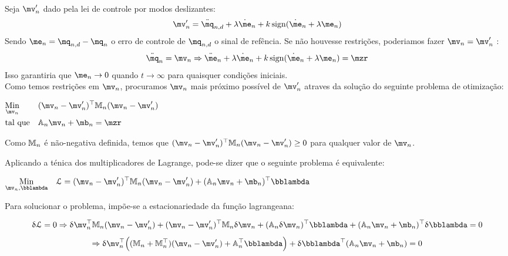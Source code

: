 Seja $\mv'_n$ dado pela lei de controle por modos deslizantes:
\begin{equation} \label{eq:SMControlowLasV1'}
\mv'_n = \ddot{\mq}_{n, d} + \lambda \dot{\me}_n + k \sign (\dot{\me}_n + \lambda \me_n)
\end{equation}
Sendo $ \me_n = \mq_{n,d} - \mq_n $ o erro de controle de $\mq_{n,d}$ o sinal de ref\^encia. Se n\~ao houvesse restri\c{c}\~oes, poderiamos fazer $ \mv_n = \mv'_n $ :
$$ \ddot{\mq}_n = \mv_n \Rightarrow  \ddot{\me}_n + \lambda \dot{\me}_n + k \sign (\dot{\me}_n + \lambda \me_n) = \mzr$$
Isso garantiria que $\me_n \rightarrow 0$ quando $t \rightarrow \infty$ para quaisquer condi\c{c}\~oes iniciais. \\

Como temos restri\c{c}\~oes em $\mv_n$, procuramos $\mv_n$ mais pr\'oximo poss\'ivel de $\mv'_n$ atraves da solu\c{c}\~ao do seguinte problema de otimiza\c{c}\~ao:

\begin{center}
$\begin{aligned}
& \underset{\mv_n}{\text{Min}}
& & (\mv_n - \mv'_n)^\top \mM_n (\mv_n - \mv'_n) \\
& \text{tal que}
& & \mA_n \mv_n + \mb_n = \mzr
\end{aligned}$
\end{center}

Como $\mathbb{M}_n$ \'e n\~ao-negativa definida, temos que $(\mv_n - \mv'_n)^\top \mM_n (\mv_n - \mv'_n) \geq 0 $ para qualquer valor de $\mv_n$.

Aplicando a t\'enica dos multiplicadores de Lagrange, pode-se dizer que o seguinte problema é equivalente:

\begin{center}
$\begin{aligned}
& \underset{\mv_n, \mlambda}{\text{Min}}
& & \llL = (\mv_n - \mv'_n)^\top \mM_n (\mv_n - \mv'_n) + (\mA_n \mv_n + \mb_n)^\top \mlambda \\
\end{aligned}$
\end{center}

Para solucionar o problema, imp\~oe-se a estacionariedade da fun\c{c}\~ao lagrangeana:

$$ \dl \llL = 0 \Rightarrow \dl \mv_n^\top \mM_n (\mv_n - \mv'_n) + (\mv_n - \mv'_n)^\top \mM_n \dl \mv_n + (\mA_n \dl \mv_n)^\top \mlambda + (\mA_n \mv_n + \mb_n)^\top \dl \mlambda = 0 $$
$$ \Rightarrow \dl \mv_n^\top \Big( (\mM_n + \mM_n^\top)(\mv_n - \mv'_n) + \mA_n^\top \mlambda \Big) + \dl \mlambda^\top (\mA_n \mv_n + \mb_n) = 0 $$

